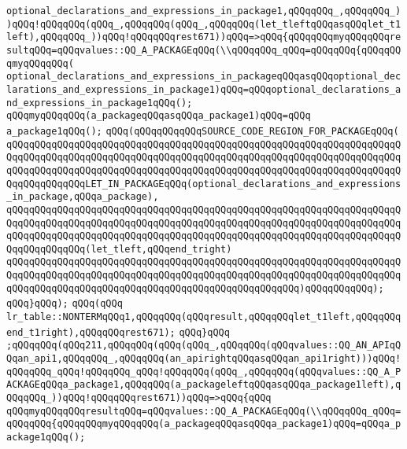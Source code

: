 \verb|optional_declarations_and_expressions_in_package1,qQQqqQQq_,qQQqqQQq_))qQQq!qQQqqQQq(qQQq_,qQQqqQQq(qQQq_,qQQqqQQq(let_tleftqQQqasqQQqlet_t1left),qQQqqQQq_))qQQq!qQQqqQQqrest671))qQQq=>qQQq{qQQqqQQqmyqQQqqQQqresultqQQq=qQQqvalues::QQ_A_PACKAGEqQQq(\\qQQqqQQq_qQQq=qQQqqQQq{qQQqqQQqmyqQQqqQQq(|\newline
\verb|optional_declarations_and_expressions_in_packageqQQqasqQQqoptional_declarations_and_expressions_in_package1)qQQq=qQQqoptional_declarations_and_expressions_in_package1qQQq();|\newline
\verb|qQQqmyqQQqqQQq(a_packageqQQqasqQQqa_package1)qQQq=qQQq|\newline
\verb|a_package1qQQq();|\newline
\verb|qQQq(qQQqqQQqqQQqSOURCE_CODE_REGION_FOR_PACKAGEqQQq(|\newline
\verb|qQQqqQQqqQQqqQQqqQQqqQQqqQQqqQQqqQQqqQQqqQQqqQQqqQQqqQQqqQQqqQQqqQQqqQQqqQQqqQQqqQQqqQQqqQQqqQQqqQQqqQQqqQQqqQQqqQQqqQQqqQQqqQQqqQQqqQQqqQQqqQQqqQQqqQQqqQQqqQQqqQQqqQQqqQQqqQQqqQQqqQQqqQQqqQQqqQQqqQQqqQQqqQQqqQQqqQQqqQQqqQQqLET_IN_PACKAGEqQQq(optional_declarations_and_expressions_in_package,qQQqa_package),|\newline
\verb|qQQqqQQqqQQqqQQqqQQqqQQqqQQqqQQqqQQqqQQqqQQqqQQqqQQqqQQqqQQqqQQqqQQqqQQqqQQqqQQqqQQqqQQqqQQqqQQqqQQqqQQqqQQqqQQqqQQqqQQqqQQqqQQqqQQqqQQqqQQqqQQqqQQqqQQqqQQqqQQqqQQqqQQqqQQqqQQqqQQqqQQqqQQqqQQqqQQqqQQqqQQqqQQqqQQqqQQqqQQqqQQq(let_tleft,qQQqend_tright)|\newline
\verb|qQQqqQQqqQQqqQQqqQQqqQQqqQQqqQQqqQQqqQQqqQQqqQQqqQQqqQQqqQQqqQQqqQQqqQQqqQQqqQQqqQQqqQQqqQQqqQQqqQQqqQQqqQQqqQQqqQQqqQQqqQQqqQQqqQQqqQQqqQQqqQQqqQQqqQQqqQQqqQQqqQQqqQQqqQQqqQQqqQQqqQQqqQQqqQQq)qQQqqQQqqQQq);|\newline
\verb|qQQq}qQQq);|\newline
\verb|qQQq(qQQq|\newline
\verb|lr_table::NONTERMqQQq1,qQQqqQQq(qQQqresult,qQQqqQQqlet_t1left,qQQqqQQqend_t1right),qQQqqQQqrest671);|\newline
\verb|qQQq}qQQq|\newline
\verb|;qQQqqQQq(qQQq211,qQQqqQQq(qQQq(qQQq_,qQQqqQQq(qQQqvalues::QQ_AN_APIqQQqan_api1,qQQqqQQq_,qQQqqQQq(an_apirightqQQqasqQQqan_api1right)))qQQq!qQQqqQQq_qQQq!qQQqqQQq_qQQq!qQQqqQQq(qQQq_,qQQqqQQq(qQQqvalues::QQ_A_PACKAGEqQQqa_package1,qQQqqQQq(a_packageleftqQQqasqQQqa_package1left),qQQqqQQq_))qQQq!qQQqqQQqrest671))qQQq=>qQQq{qQQq|\newline
\verb|qQQqmyqQQqqQQqresultqQQq=qQQqvalues::QQ_A_PACKAGEqQQq(\\qQQqqQQq_qQQq=qQQqqQQq{qQQqqQQqmyqQQqqQQq(a_packageqQQqasqQQqa_package1)qQQq=qQQqa_package1qQQq();|\newline
